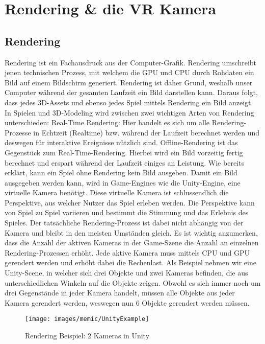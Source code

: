 \section{Rendering \& die VR Kamera}


\subsection{Rendering}

Rendering ist ein Fachausdruck aus der Computer-Grafik. Rendering umschreibt jenen technischen Prozess, mit welchem die GPU und CPU durch Rohdaten ein Bild auf einem Bildschirm generiert. Rendering ist daher Grund, weshalb unser Computer während der gesamten Laufzeit ein Bild darstellen kann. Daraus folgt, dass jedes 3D-Assets und ebenso jedes Spiel mittels Rendering ein Bild anzeigt. In Spielen und 3D-Modeling wird zwischen zwei wichtigen Arten von Rendering unterschieden:
Real-Time Rendering: Hier handelt es sich um alle Rendering-Prozesse in Echtzeit (Realtime) bzw. während der Laufzeit berechnet werden und deswegen für interaktive Ereignisse nützlich sind.\cite{_guide_to_Build_3D_Character}
Offline-Rendering ist das Gegenstück zum Real-Time-Rendering. Hierbei wird ein Bild vorzeitig fertig berechnet und erspart während der Laufzeit einiges an Leistung.\cite{_guide_to_Build_3D_Character}
Wie bereits erklärt, kann ein Spiel ohne Rendering kein Bild ausgeben. Damit ein Bild ausgegeben werden kann, wird in Game-Engines wie die Unity-Engine, eine virtuelle Kamera benötigt. Diese virtuelle Kamera ist schlussendlich die Perspektive, aus welcher Nutzer das Spiel erleben werden. Die Perspektive kann von Spiel zu Spiel variieren und bestimmt die Stimmung und das Erlebnis des Spieles. Der tatsächliche Rendering-Prozess ist dabei nicht abhängig von der Kamera und bleibt in den meisten Umständen gleich.
Es ist wichtig anzumerken, dass die Anzahl der aktiven Kameras in der Game-Szene die Anzahl an einzelnen Rendering-Prozessen erhöht. Jede aktive Kamera muss mittels CPU und GPU gerendert werden und erhöht dabei die Rechenlast.
Als Beispiel nehmen wir eine Unity-Scene, in welcher sich drei Objekte und zwei Kameras befinden, die aus unterschiedlichen Winkeln auf die Objekte zeigen. Obwohl es sich immer noch um drei Gegenstände in jeder Kamera handelt, müssen alle Objekte aus jeder Kamera gerendert werden, weswegen nun 6 Objekte gerendert werden müssen.

\begin{figure}[H]
	\centering
	\texttt{[image: images/memic/UnityExample]}
	\caption{Rendering Beispiel: 2 Kameras in Unity}
\end{figure}

